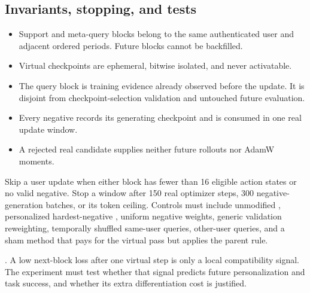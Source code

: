\subsection{Invariants, stopping, and tests}

\begin{itemize}
  \item Support and meta-query blocks belong to the same authenticated user and
  adjacent ordered periods.  Future blocks cannot be backfilled.
  \item Virtual checkpoints are ephemeral, bitwise isolated, and never
  activatable.
  \item The query block is training evidence already observed before the
  update.  It is disjoint from checkpoint-selection validation and untouched
  future evaluation.
  \item Every negative records its generating checkpoint and is consumed in
  one real update window.
  \item A rejected real candidate supplies neither future rollouts nor AdamW
  moments.
\end{itemize}

Skip a user update when either block has fewer than 16 eligible action states
or no valid negative.  Stop a window after 150 real optimizer steps, 300
negative-generation batches, or its token ceiling.  Controls must include
unmodified \agenticdpo, personalized hardest-negative \agenticdpo, uniform
negative weights, generic validation reweighting, temporally shuffled
same-user queries, other-user queries, and a sham method that pays for the
virtual pass but applies the parent rule.

\Evidence.  A low next-block loss after one virtual step is only a local
compatibility signal.  The experiment must test whether that signal predicts
future personalization and task success, and whether its extra differentiation
cost is justified.

